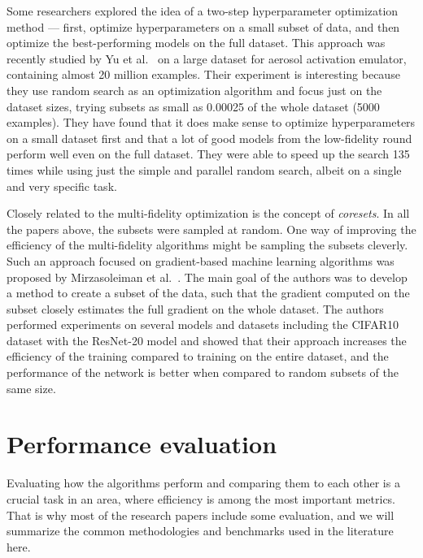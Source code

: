 
Some researchers explored the idea of a two-step hyperparameter optimization method --- first, optimize hyperparameters on a small subset of data, and then optimize the best-performing models on the full dataset. This approach was recently studied by Yu et al.~\cite{yu2024two} on a large dataset for aerosol activation emulator, containing almost 20 million examples. Their experiment is interesting because they use random search as an optimization algorithm and focus just on the dataset sizes, trying subsets as small as 0.00025 of the whole dataset (5000 examples). They have found that it does make sense to optimize hyperparameters on a small dataset first and that a lot of good models from the low-fidelity round perform well even on the full dataset. They were able to speed up the search 135 times while using just the simple and parallel random search, albeit on a single and very specific task.

Closely related to the multi-fidelity optimization is the concept of \textit{coresets}. In all the papers above, the subsets were sampled at random. One way of improving the efficiency of the multi-fidelity algorithms might be sampling the subsets cleverly. Such an approach focused on gradient-based machine learning algorithms was proposed by Mirzasoleiman et al.~\cite{mirzasoleiman2020coresets}. The main goal of the authors was to develop a method to create a subset of the data, such that the gradient computed on the subset closely estimates the full gradient on the whole dataset. The authors performed experiments on several models and datasets including the CIFAR10 dataset with the ResNet-20 model and showed that their approach increases the efficiency of the training compared to training on the entire dataset, and the performance of the network is better when compared to random subsets of the same size.

\section{Performance evaluation}
Evaluating how the algorithms perform and comparing them to each other is a crucial task in an area, where efficiency is among the most important metrics. That is why most of the research papers include some evaluation, and we will summarize the common methodologies and benchmarks used in the literature here.


